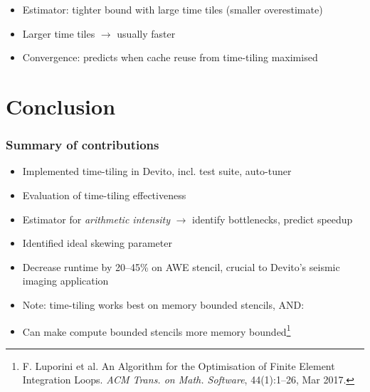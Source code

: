 \documentclass{beamer}
\begin{document}
\begin{frame}
\begin{itemize}
	\item Estimator: tighter bound with large time tiles (smaller overestimate)
	\item Larger time tiles \(\rightarrow\) usually faster
	\item Convergence: predicts when cache reuse from time-tiling maximised
\end{itemize}
\end{frame}



\section{Conclusion}

\begin{frame}
\frametitle{Summary of contributions}

\begin{itemize}
	\item Implemented time-tiling in Devito, incl. test suite, auto-tuner
	\item Evaluation of time-tiling effectiveness
	\item Estimator for \emph{arithmetic intensity} \(\rightarrow\) identify bottlenecks, predict speedup
	\item Identified ideal skewing parameter
	\item Decrease runtime by 20--45\% on AWE stencil, crucial to Devito's seismic imaging application
	\newline
	\item Note: time-tiling works best on memory bounded stencils, AND:
	\item Can make compute bounded stencils more memory bounded\footnote{F. Luporini et al. An Algorithm for the Optimisation of Finite Element Integration Loops. \emph{ACM Trans. on Math. Software}, 44(1):1--26, Mar 2017.}
\end{itemize}
\end{frame}
\end{document}
